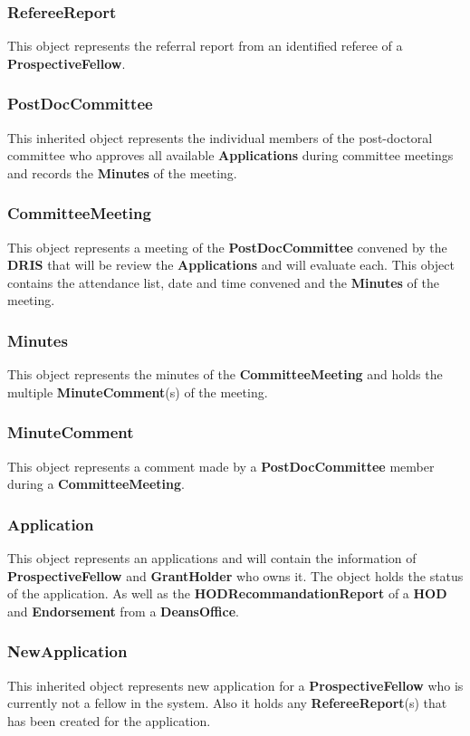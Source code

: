 \documentclass[12pt]{article}
\begin{document}
\subsubsection{RefereeReport}
This object represents the referral report from an identified referee of a \textbf{ProspectiveFellow}.

\subsubsection{PostDocCommittee}
This inherited object represents the individual members of the post-doctoral committee who approves all available \textbf{Applications} during committee meetings and records the \textbf{Minutes} of the meeting.

\subsubsection{CommitteeMeeting}
This object represents a meeting of the \textbf{PostDocCommittee} convened by the \textbf{DRIS} that will be review the \textbf{Applications} and will evaluate each. This object contains the attendance list, date and time convened and the \textbf{Minutes} of the meeting.

\subsubsection{Minutes}
This object represents the minutes of the \textbf{CommitteeMeeting} and holds the multiple \textbf{MinuteComment}(s) of the meeting.

\subsubsection{MinuteComment}
This object represents a comment made by a \textbf{PostDocCommittee} member during a \textbf{CommitteeMeeting}.

\subsubsection{Application}
This object represents an applications and will contain the information of \textbf{ProspectiveFellow} and \textbf{GrantHolder} who owns it. The object holds the status of the application. As well as the \textbf{HODRecommandationReport} of a \textbf{HOD} and \textbf{Endorsement} from a \textbf{DeansOffice}.

\subsubsection{NewApplication}
This inherited object represents new application for a \textbf{ProspectiveFellow} who is currently not a fellow in the system. Also it holds any \textbf{RefereeReport}(s) that has been created for the application.
\end{document}
